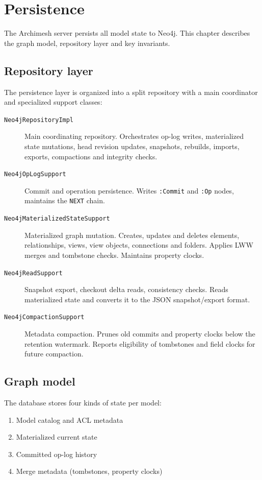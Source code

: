 \section{Persistence}
\label{sec:Persistence}

The Archimesh server persists all model state to Neo4j. This chapter describes
the graph model, repository layer and key invariants.

\subsection{Repository layer}

The persistence layer is organized into a split repository with a main
coordinator and specialized support classes:

\begin{description}
\item[\texttt{Neo4jRepositoryImpl}] Main coordinating repository. Orchestrates
  op-log writes, materialized state mutations, head revision updates,
  snapshots, rebuilds, imports, exports, compactions and integrity checks.
\item[\texttt{Neo4jOpLogSupport}] Commit and operation persistence. Writes
  \texttt{:Commit} and \texttt{:Op} nodes, maintains the \texttt{NEXT}
  chain.
\item[\texttt{Neo4jMaterializedStateSupport}] Materialized graph mutation.
  Creates, updates and deletes elements, relationships, views, view objects,
  connections and folders. Applies LWW merges and tombstone checks.
  Maintains property clocks.
\item[\texttt{Neo4jReadSupport}] Snapshot export, checkout delta reads,
  consistency checks. Reads materialized state and converts it to the JSON
  snapshot/export format.
\item[\texttt{Neo4jCompactionSupport}] Metadata compaction. Prunes old
  commits and property clocks below the retention watermark. Reports
  eligibility of tombstones and field clocks for future compaction.
\end{description}

\subsection{Graph model}

The database stores four kinds of state per model:

\begin{enumerate}
\item Model catalog and ACL metadata
\item Materialized current state
\item Committed op-log history
\item Merge metadata (tombstones, property clocks)
\end{enumerate}

